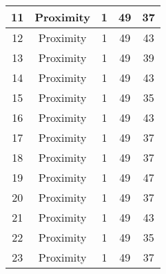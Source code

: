 \documentclass[results.tex]{subfiles}
\begin{document}
\begin{center}
\begin{tabular}{| c || c | c | c | c |}
            \hline
            11                      & Proximity                    & 1                      & 49                      & 37                   \\
            \hline
            12                      & Proximity                    & 1                      & 49                      & 43                   \\
            \hline
            13                      & Proximity                    & 1                      & 49                      & 39                   \\
            \hline
            14                      & Proximity                    & 1                      & 49                      & 43                   \\
            \hline
            15                      & Proximity                    & 1                      & 49                      & 35                   \\
            \hline
            16                      & Proximity                    & 1                      & 49                      & 43                   \\
            \hline
            17                      & Proximity                    & 1                      & 49                      & 37                   \\
            \hline
            18                      & Proximity                    & 1                      & 49                      & 37                   \\
            \hline
            19                      & Proximity                    & 1                      & 49                      & 47                   \\
            \hline
            20                      & Proximity                    & 1                      & 49                      & 37                   \\
            \hline
            21                      & Proximity                    & 1                      & 49                      & 43                   \\
            \hline
            22                      & Proximity                    & 1                      & 49                      & 35                   \\
            \hline
            23                      & Proximity                    & 1                      & 49                      & 37                   \\

\end{tabular}
\end{center}
\end{document}
